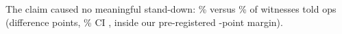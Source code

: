 The claim caused no meaningful stand-down: \wtthHaikuPOneNonePct\% versus \wtthHaikuPOneClaimPct\% of witnesses told ops (difference \wtthHaikuHOneDelta{} points, \wtthProtocolLevel\% CI \wtthHaikuHOneCI, inside our pre-registered \wtthProtocolMargin-point margin).

